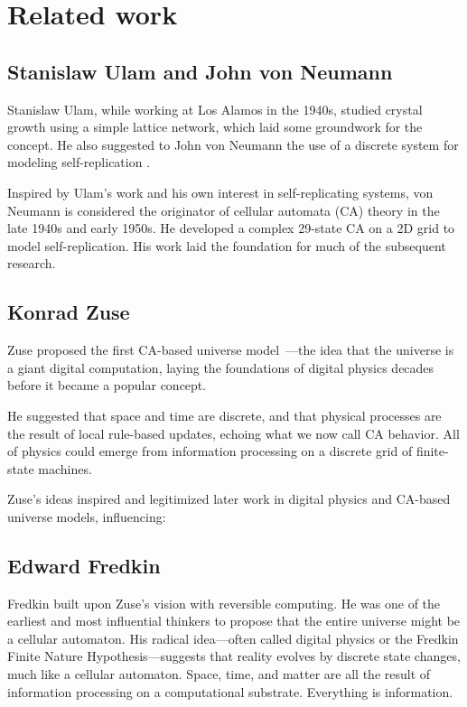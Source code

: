 \documentclass[12pt,english]{article}
\begin{document}
\section{Related work} \label{sec:related-work}

\subsection*{Stanislaw Ulam and John von Neumann}
Stanislaw Ulam, while working at Los Alamos in the 1940s, studied crystal growth using a simple lattice network, which laid some groundwork for the concept. He also suggested to John von Neumann the use of a discrete system for modeling self-replication \cite{ulam1952,vonNeumann1966}.

Inspired by Ulam's work and his own interest in self-replicating systems, von Neumann is considered the originator of cellular automata (CA) theory in the late 1940s and early 1950s. He developed a complex 29-state CA on a 2D grid to model self-replication. His work laid the foundation for much of the subsequent research.

\subsection*{Konrad Zuse}
Zuse proposed the first CA-based universe model~\cite{zuse}—the idea that the universe is a giant digital computation, laying the foundations of digital physics decades before it became a popular concept.

He suggested that space and time are discrete, and that physical processes are the result of local rule-based updates, echoing what we now call CA behavior. All of physics could emerge from information processing on a discrete grid of finite-state machines.

Zuse’s ideas inspired and legitimized later work in digital physics and CA-based universe models, influencing:

\subsection*{Edward Fredkin}
Fredkin \cite{fredkin} built upon Zuse’s vision with reversible computing. He was one of the earliest and most influential thinkers to propose that the entire universe might be a cellular automaton. His radical idea—often called digital physics or the Fredkin Finite Nature Hypothesis—suggests that reality evolves by discrete state changes, much like a cellular automaton. Space, time, and matter are all the result of information processing on a computational substrate. Everything is information.
\end{document}
